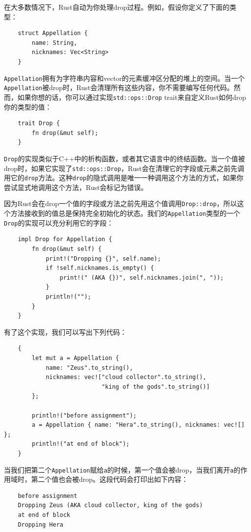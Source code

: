 在大多数情况下，Rust自动为你处理drop过程。例如，假设你定义了下面的类型：
\begin{verbatim}
    struct Appellation {
        name: String,
        nicknames: Vec<String>
    }
\end{verbatim}

\texttt{Appellation}拥有为字符串内容和vector的元素缓冲区分配的堆上的空间。当一个\texttt{Appellation}被drop时，Rust会清理所有这些内容，你不需要编写任何代码。然而，如果你想的话，你可以通过实现\texttt{std::ops::Drop} trait来自定义Rust如何drop你的类型的值：
\begin{verbatim}
    trait Drop {
        fn drop(&mut self);
    }
\end{verbatim}

\texttt{Drop}的实现类似于C++中的析构函数，或者其它语言中的终结函数。当一个值被drop时，如果它实现了\texttt{std::ops::Drop}，Rust会在清理它的字段或元素之前先调用它的\texttt{drop}方法。这种\texttt{drop}的隐式调用是唯一一种调用这个方法的方式，如果你尝试显式地调用这个方法，Rust会标记为错误。

因为Rust会在drop一个值的字段或方法之前先用这个值调用\texttt{Drop::drop}，所以这个方法接收到的值总是保持完全初始化的状态。我们的\texttt{Appellation}类型的一个\texttt{Drop}的实现可以充分利用它的字段：
\begin{verbatim}
    impl Drop for Appellation {
        fn drop(&mut self) {
            print!("Dropping {}", self.name);
            if !self.nicknames.is_empty() {
                print!(" (AKA {})", self.nicknames.join(", "));
            }
            println!("");
        }
    }
\end{verbatim}

有了这个实现，我们可以写出下列代码：
\begin{verbatim}
    {
        let mut a = Appellation {
            name: "Zeus".to_string(),
            nicknames: vec!["cloud collector".to_string(),
                            "king of the gods".to_string()]
        };

        println!("before assignment");
        a = Appellation { name: "Hera".to_string(), nicknames: vec![] };
        println!("at end of block");
    }
\end{verbatim}

当我们把第二个\texttt{Appellation}赋给\texttt{a}的时候，第一个值会被drop，当我们离开\texttt{a}的作用域时，第二个值也会被drop。这段代码会打印出如下内容：
\begin{verbatim}
    before assignment
    Dropping Zeus (AKA cloud collector, king of the gods)
    at end of block
    Dropping Hera
\end{verbatim}

